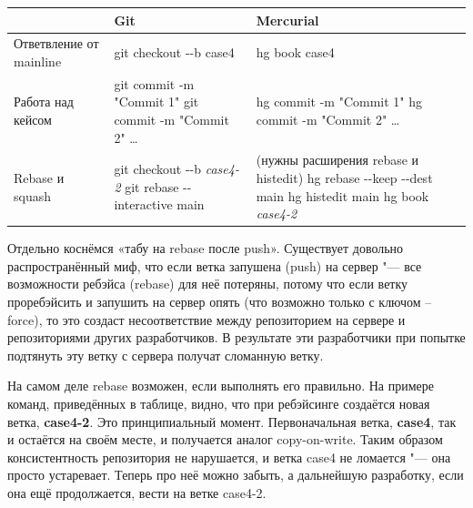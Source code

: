 \documentclass[10pt, a5paper]{article}
\begin{document}
\begin{table}
  \centering
  \begin{tabular}{P{2.5cm}|P{3.5cm}|P{3.5cm}}
    \hline
                                  ~  & \textbf{Git}                   & \textbf{Mercurial}          \\ \hline
    Ответвление от mainline          & git checkout -{}-b case4       & hg book case4              \\
    Работа над кейсом                & git commit -m "Commit 1" \newline
                                       git commit -m "Commit 2" \ldots{}
                                                                    & hg commit -m "Commit 1" \newline
                                                                      hg commit -m "Commit 2" \ldots{} \\
    Rebase и squash              & git checkout -{}-b \emph{case4-2} \newline
                                   git rebase -{}-interactive main
                                                     & (нужны расширения rebase и histedit) \newline
                                                       hg rebase -{}-keep -{}-dest main \newline
                                                       hg histedit main \newline
                                                       hg book \emph{case4-2}      \\
    \hline
  \end{tabular}
\end{table}
Отдельно коснёмся «табу на rebase после push». Существует довольно распространённый миф, что если ветка запушена (push) на сервер "--- все возможности ребэйса (rebase) для неё потеряны, потому что если ветку проребэйсить и запушить на сервер опять (что возможно только с ключом --force), то это создаст несоответствие между репозиторием на сервере и репозиториями других разработчиков. В результате эти разработчики при попытке подтянуть эту ветку с сервера получат сломанную ветку.

На самом деле rebase возможен, если выполнять его правильно. На примере команд, приведённых в таблице, видно, что при ребэйсинге создаётся новая ветка, \textbf{case4-2}. Это принципиальный момент. Первоначальная ветка, \textbf{case4}, так и остаётся на своём месте, и получается аналог copy-on-write. Таким образом консистентность репозитория не нарушается, и ветка case4 не ломается "--- она просто устаревает. Теперь про неё можно забыть, а дальнейшую разработку, если она ещё продолжается, вести на ветке case4-2.
\end{document}

